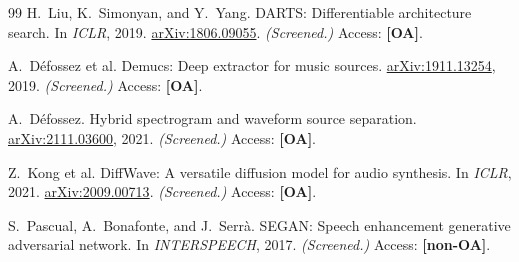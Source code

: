 \documentclass[10pt,twocolumn,letterpaper]{article}
\begin{document}
{\begin{thebibliography}{99}
H.~Liu, K.~Simonyan, and Y.~Yang.
\newblock DARTS: Differentiable architecture search.
\newblock In \emph{ICLR}, 2019.
\newblock \href{https://arxiv.org/abs/1806.09055}{arXiv:1806.09055}. \textit{(Screened.)}
\newblock Access: \textbf{[OA]}.

A.~D\'efossez et al.
\newblock Demucs: Deep extractor for music sources.
\newblock \href{https://arxiv.org/abs/1911.13254}{arXiv:1911.13254}, 2019. \textit{(Screened.)}
\newblock Access: \textbf{[OA]}.

A.~D\'efossez.
\newblock Hybrid spectrogram and waveform source separation.
\newblock \href{https://arxiv.org/abs/2111.03600}{arXiv:2111.03600}, 2021. \textit{(Screened.)}
\newblock Access: \textbf{[OA]}.

Z.~Kong et al.
\newblock DiffWave: A versatile diffusion model for audio synthesis.
\newblock In \emph{ICLR}, 2021.
\newblock \href{https://arxiv.org/abs/2009.00713}{arXiv:2009.00713}. \textit{(Screened.)}
\newblock Access: \textbf{[OA]}.

S.~Pascual, A.~Bonafonte, and J.~Serr\`a.
\newblock SEGAN: Speech enhancement generative adversarial network.
\newblock In \emph{INTERSPEECH}, 2017. \textit{(Screened.)}
\newblock Access: \textbf{[non-OA]}.

\end{thebibliography}
}
\end{document}
